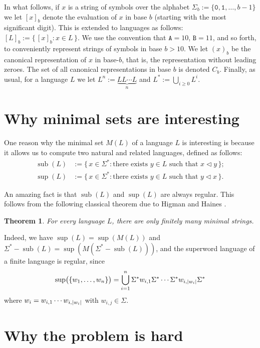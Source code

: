 \documentclass[12pt]{article}
\DeclarePairedDelimiter\abs{\lvert}{\rvert}
\DeclarePairedDelimiter\paren{\lparen}{\rparen}
\def\subw{\mathrel{\triangleleft}}
\DeclareMathOperator\supe{sup}
\DeclareMathOperator\subb{sub}
\theoremstyle{plain}
\newtheorem{theorem}{Theorem}
\theoremstyle{definition}
\theoremstyle{remark}
\newcommand{\0}{\mathtt{0}}
\newcommand{\1}{\mathtt{1}}
\newcommand{\2}{\mathtt{2}}
\newcommand{\3}{\mathtt{3}}
\newcommand{\4}{\mathtt{4}}
\newcommand{\5}{\mathtt{5}}
\newcommand{\6}{\mathtt{6}}
\newcommand{\7}{\mathtt{7}}
\newcommand{\8}{\mathtt{8}}
\newcommand{\9}{\mathtt{9}}
\newcommand{\A}{\mathtt{A}}
\newcommand{\B}{\mathtt{B}}
\newcommand{\set}[2]{\{\,#1{}:{}#2\,\}}
\begin{document}
In what follows, if $x$ is a string of symbols over the alphabet
$\Sigma_b := \lbrace \0, \1, \dotsc, b-1 \rbrace$ we let 
$[x]_b$ denote the evaluation of $x$ in base $b$ (starting with the
most significant digit).  This is extended to languages as follows:
$[L]_b := \set{ [x]_b }{ x \in L }$.
We use the convention that $\A = 10$, $\B = 11$, and so forth,
to conveniently represent strings of symbols in base $b > 10$.
We let $(x)_b$ be the canonical representation
of $x$ in base-$b$, that is, the representation without leading zeroes.
The set of all canonical representations in base $b$ is denoted
$C_b$.  Finally, as usual, for a language $L$ we let
$L^n := \underbrace{LL\dotsm L}_n$ and $L^* := \bigcup_{i \geq 0} L^i$.

\section{Why minimal sets are interesting}

One reason why
the minimal set $M(L)$ of a language $L$ is interesting is because it
allows us to compute two natural and related languages,
defined as follows:
\begin{align*}
\subb(L) &:= \set{x \in \Sigma^*}{\text{there exists $y \in L$ such that $x \subw y$}} ; \\
\supe(L) &:= \set{x \in \Sigma^*}{\text{there exists $y \in L$ such that $y \subw x$}} .
\end{align*}

An amazing fact is that $\subb(L)$ and $\supe(L)$ are always regular.
This follows from
the following classical theorem due to Higman \cite{Hi52} and
Haines \cite{Ha69}.

\begin{theorem}
For every language $L$, there are only finitely many minimal strings.
\end{theorem}

Indeed, we have $\supe(L) = \supe(M(L))$
and $\Sigma^* - \subb(L) = \supe(M(\Sigma^* - \subb(L)))$, and
the superword language of a finite language is regular, since
\[ \supe\paren[\big]{\{w_1,\dotsc,w_n\}} = \bigcup_{i=1}^n \Sigma^* w_{i,1} \Sigma^* \dotsm \Sigma^* w_{i,\abs{w_i}} \Sigma^* \]
where $w_i=w_{i,1}\dotsm w_{i,\abs{w_i}}$ with $w_{i,j}\in\Sigma$.

\section{Why the problem is hard}
\end{document}
